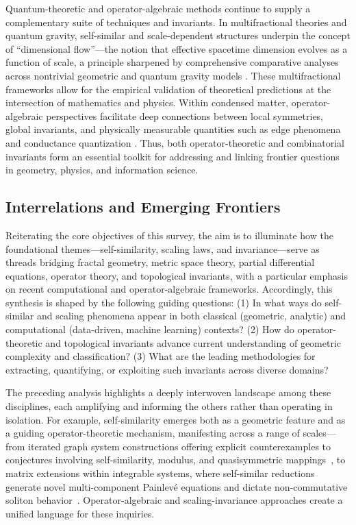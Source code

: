 \documentclass[sigconf]{acmart}
\begin{document}
Quantum-theoretic and operator-algebraic methods continue to supply a complementary suite of techniques and invariants. In multifractional theories and quantum gravity, self-similar and scale-dependent structures underpin the concept of ``dimensional flow''—the notion that effective spacetime dimension evolves as a function of scale, a principle sharpened by comprehensive comparative analyses across nontrivial geometric and quantum gravity models \cite{ref5,ref7,ref20}. These multifractional frameworks allow for the empirical validation of theoretical predictions at the intersection of mathematics and physics. Within condensed matter, operator-algebraic perspectives facilitate deep connections between local symmetries, global invariants, and physically measurable quantities such as edge phenomena and conductance quantization \cite{ref56,ref57,ref58}. Thus, both operator-theoretic and combinatorial invariants form an essential toolkit for addressing and linking frontier questions in geometry, physics, and information science.

\subsection{Interrelations and Emerging Frontiers}

Reiterating the core objectives of this survey, the aim is to illuminate how the foundational themes---self-similarity, scaling laws, and invariance---serve as threads bridging fractal geometry, metric space theory, partial differential equations, operator theory, and topological invariants, with a particular emphasis on recent computational and operator-algebraic frameworks. Accordingly, this synthesis is shaped by the following guiding questions: (1) In what ways do self-similar and scaling phenomena appear in both classical (geometric, analytic) and computational (data-driven, machine learning) contexts? (2) How do operator-theoretic and topological invariants advance current understanding of geometric complexity and classification? (3) What are the leading methodologies for extracting, quantifying, or exploiting such invariants across diverse domains?

The preceding analysis highlights a deeply interwoven landscape among these disciplines, each amplifying and informing the others rather than operating in isolation. For example, self-similarity emerges both as a geometric feature and as a guiding operator-theoretic mechanism, manifesting across a range of scales---from iterated graph system constructions offering explicit counterexamples to conjectures involving self-similarity, modulus, and quasisymmetric mappings~\cite{ref35}, to matrix extensions within integrable systems, where self-similar reductions generate novel multi-component Painlevé equations and dictate non-commutative soliton behavior~\cite{ref64}. Operator-algebraic and scaling-invariance approaches create a unified language for these inquiries.
\end{document}
